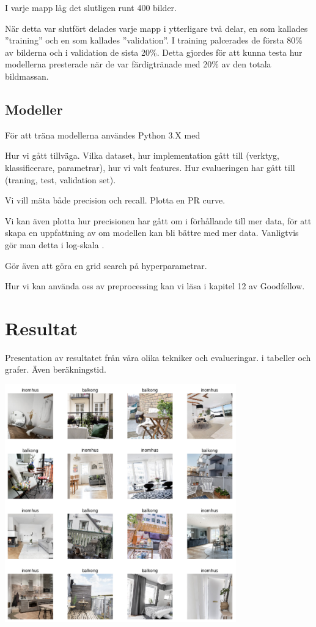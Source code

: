 \documentclass{kththesis}
\begin{document}
I varje mapp låg det slutligen runt 400 bilder. 

När detta var slutfört delades varje mapp i ytterligare två delar, en som kallades ”training” och en som kallades ”validation”.
I training palcerades de första 80\% av bilderna och i validation de sista 20\%.
Detta gjordes för att kunna testa hur modellerna presterade när de var färdigtränade med 20\% av den totala bildmassan.


\section{Modeller}
För att träna modellerna användes Python 3.X med 


Hur vi gått tillväga. Vilka dataset, hur implementation gått till (verktyg, klassificerare, parametrar), hur vi valt features.
Hur evalueringen har gått till (traning, test, validation set).

Vi vill mäta både precision och recall. Plotta en PR curve.

Vi kan även plotta hur precisionen har gått om i förhållande till mer data, för att skapa en uppfattning av om modellen kan bli bättre med mer data. Vanligtvis gör man detta i log-skala \parencite{Goodfellow-et-al-2016}. 

Gör även att göra en grid search på hyperparametrar.

Hur vi kan använda oss av preprocessing kan vi  läsa i kapitel 12 av Goodfellow.

\chapter{Resultat}
Presentation av resultatet från våra olika tekniker och evalueringar. i tabeller och grafer. Även beräkningstid. 

\includegraphics[width=10cm]{../images/1.png}
\end{document}
